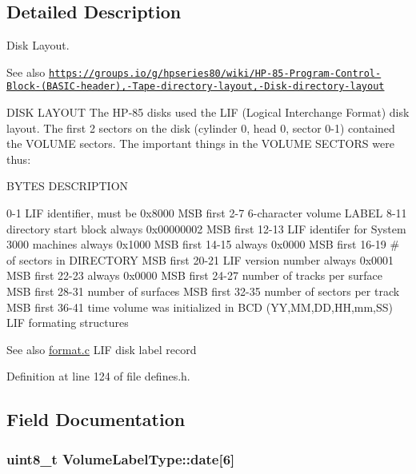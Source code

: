 \subsection{Detailed Description}
Disk Layout. 

\begin{DoxySeeAlso}{See also}
\href{https://groups.io/g/hpseries80/wiki/HP-85-Program-Control-Block-(BASIC-header),-Tape-directory-layout,-Disk-directory-layout}{\tt https\+://groups.\+io/g/hpseries80/wiki/\+H\+P-\/85-\/\+Program-\/\+Control-\/\+Block-\/(\+B\+A\+S\+I\+C-\/header),-\/\+Tape-\/directory-\/layout,-\/\+Disk-\/directory-\/layout}
\end{DoxySeeAlso}
D\+I\+SK L\+A\+Y\+O\+UT The H\+P-\/85 disks used the L\+IF (Logical Interchange Format) disk layout. The first 2 sectors on the disk (cylinder 0, head 0, sector 0-\/1) contained the V\+O\+L\+U\+ME sectors. The important things in the V\+O\+L\+U\+ME S\+E\+C\+T\+O\+RS were thus\+:

B\+Y\+T\+ES D\+E\+S\+C\+R\+I\+P\+T\+I\+ON 

 0-\/1 L\+IF identifier, must be 0x8000 M\+SB first 2-\/7 6-\/character volume L\+A\+B\+EL 8-\/11 directory start block always 0x00000002 M\+SB first 12-\/13 L\+IF identifer for System 3000 machines always 0x1000 M\+SB first 14-\/15 always 0x0000 M\+SB first 16-\/19 \# of sectors in D\+I\+R\+E\+C\+T\+O\+RY M\+SB first 20-\/21 L\+IF version number always 0x0001 M\+SB first 22-\/23 always 0x0000 M\+SB first 24-\/27 number of tracks per surface M\+SB first 28-\/31 number of surfaces M\+SB first 32-\/35 number of sectors per track M\+SB first 36-\/41 time volume was initialized in B\+CD (YY,MM,DD,HH,mm,SS) L\+IF formating structures \begin{DoxySeeAlso}{See also}
\hyperlink{format_8c}{format.\+c} L\+IF disk label record 
\end{DoxySeeAlso}


Definition at line 124 of file defines.\+h.



\subsection{Field Documentation}
\subsubsection[{\texorpdfstring{date}{date}}]{\setlength{\rightskip}{0pt plus 5cm}uint8\+\_\+t Volume\+Label\+Type\+::date\mbox{[}6\mbox{]}}\hypertarget{structVolumeLabelType_afd5885a37ea57ff74409f8c62a55bd1a}{}\label{structVolumeLabelType_afd5885a37ea57ff74409f8c62a55bd1a}


